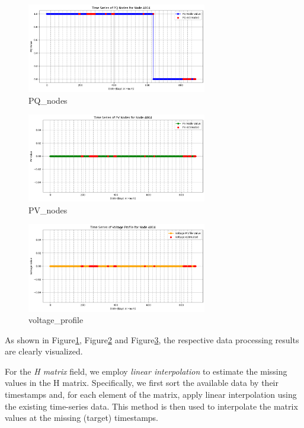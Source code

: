 \documentclass[12pt]{article}
\begin{document}
\begin{figure}[H]
    \centering
    \includegraphics[width=0.7\textwidth]{picture/PQ_nodes.png}
    \caption{PQ\_nodes}
\label{fig:PQ_nodes}
\end{figure}

\begin{figure}[H]
    \centering
    \includegraphics[width=0.7\textwidth]{picture/PV_nodes.png}
    \caption{PV\_nodes}
\label{fig:PV_nodes}
\end{figure}

\begin{figure}[H]
    \centering
    \includegraphics[width=0.7\textwidth]{picture/voltage_profile.png}
    \caption{voltage\_profile}
\label{fig:voltage_profile}
\end{figure}

As shown in Figure\ref{fig:PQ_nodes}, Figure\ref{fig:PV_nodes} and Figure\ref{fig:voltage_profile}, the respective data processing results are clearly visualized.

For the \emph{H matrix} field, we employ \emph{linear interpolation} to estimate the missing values in the H matrix. Specifically, we first sort the available data by their timestamps and, for each element of the matrix, apply linear interpolation using the existing time-series data. This method is then used to interpolate the matrix values at the missing (target) timestamps.
\end{document}
